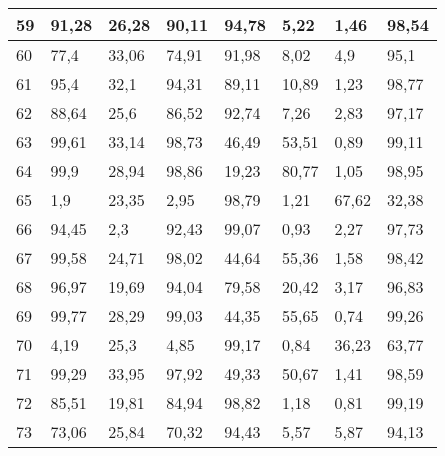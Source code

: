 \begin{longtable}[c]{|l|l|l|l|l|l|l|l|}
59              & 91,28        & 26,28        & 90,11       & 94,78         & 5,22          & 1,46          & 98,54         \\ \hline
60              & 77,4         & 33,06        & 74,91       & 91,98         & 8,02          & 4,9           & 95,1          \\ \hline
61              & 95,4         & 32,1         & 94,31       & 89,11         & 10,89         & 1,23          & 98,77         \\ \hline
62              & 88,64        & 25,6         & 86,52       & 92,74         & 7,26          & 2,83          & 97,17         \\ \hline
63              & 99,61        & 33,14        & 98,73       & 46,49         & 53,51         & 0,89          & 99,11         \\ \hline
64              & 99,9         & 28,94        & 98,86       & 19,23         & 80,77         & 1,05          & 98,95         \\ \hline
65              & 1,9          & 23,35        & 2,95        & 98,79         & 1,21          & 67,62         & 32,38         \\ \hline
66              & 94,45        & 2,3          & 92,43       & 99,07         & 0,93          & 2,27          & 97,73         \\ \hline
67              & 99,58        & 24,71        & 98,02       & 44,64         & 55,36         & 1,58          & 98,42         \\ \hline
68              & 96,97        & 19,69        & 94,04       & 79,58         & 20,42         & 3,17          & 96,83         \\ \hline
69              & 99,77        & 28,29        & 99,03       & 44,35         & 55,65         & 0,74          & 99,26         \\ \hline
70              & 4,19         & 25,3         & 4,85        & 99,17         & 0,84          & 36,23         & 63,77         \\ \hline
71              & 99,29        & 33,95        & 97,92       & 49,33         & 50,67         & 1,41          & 98,59         \\ \hline
72              & 85,51        & 19,81        & 84,94       & 98,82         & 1,18          & 0,81          & 99,19         \\ \hline
73              & 73,06        & 25,84        & 70,32       & 94,43         & 5,57          & 5,87          & 94,13         \\ \hline

\end{longtable}
